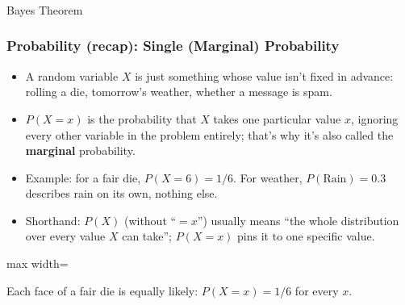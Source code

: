 \begin{frame}[fragile]\frametitle{}
\begin{center}
{\Large Bayes Theorem}
\end{center}
\end{frame}


\begin{frame}[fragile]\frametitle{Probability (recap): Single (Marginal) Probability}
\begin{itemize}
\item A random variable $X$ is just something whose value isn't fixed in advance: rolling a die, tomorrow's weather, whether a message is spam.
\item $P(X=x)$ is the probability that $X$ takes one particular value $x$, ignoring every other variable in the problem entirely; that's why it's also called the \textbf{marginal} probability.
\item Example: for a fair die, $P(X=6) = 1/6$. For weather, $P(\text{Rain}) = 0.3$ describes rain on its own, nothing else.
\item Shorthand: $P(X)$ (without ``$=x$'') usually means ``the whole distribution over every value $X$ can take''; $P(X=x)$ pins it to one specific value.
\end{itemize}
\begin{center}
\begin{adjustbox}{max width=\linewidth}
\end{adjustbox}
\vspace{2mm}

{\small Each face of a fair die is equally likely: $P(X=x)=1/6$ for every $x$.}
\end{center}
\end{frame}

